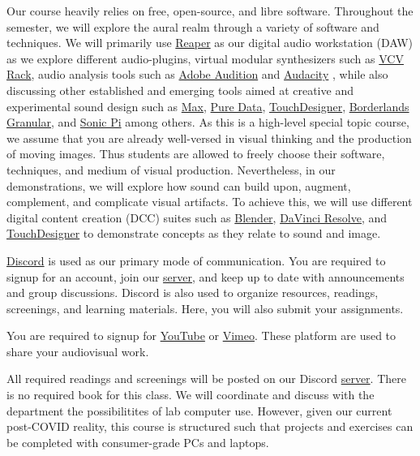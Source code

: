 Our course heavily relies on free, open-source, and libre software. Throughout the semester, we will explore the aural realm through a variety of software and techniques. We will primarily use \href{https://www.reaper.fm/}{Reaper} as our digital audio workstation (DAW) as we explore different audio-plugins, virtual modular synthesizers such as \href{https://vcvrack.com/Rack}{VCV Rack}, audio analysis tools such as \href{https://www.adobe.com/products/audition.html}{Adobe Audition} and \href{https://www.audacityteam.org/}{Audacity} , while also discussing other established and emerging tools aimed at creative and experimental sound design such as \href{https://cycling74.com/products/max}{Max}, \href{https://puredata.info/}{Pure Data}, \href{https://derivative.ca/}{TouchDesigner}, \href{http://www.borderlands-granular.com/app/}{Borderlands Granular}, and \href{https://sonic-pi.net/}{Sonic Pi} among others. As this is a high-level special topic course, we assume that you are already well-versed in visual thinking and the production of moving images. Thus students are allowed to freely choose their software, techniques, and medium of visual production. Nevertheless, in our demonstrations, we will explore how sound can build upon, augment, complement, and complicate visual artifacts. To achieve this, we will use different digital content creation (DCC) suites such as \href{http://blender.org/}{Blender}, \href{https://www.blackmagicdesign.com/products/davinciresolve/}{DaVinci Resolve}, and \href{https://derivative.ca/}{TouchDesigner} to demonstrate concepts as they relate to sound and image.


\href{http://discordapp.com/}{Discord} is used as our primary mode of communication. You are required to signup for an account, join our \href{\discordURL}{server}, and keep up to date with announcements and group discussions. Discord is also used to organize resources, readings, screenings, and learning materials. Here, you will also submit your assignments.

You are required to signup for \href{https://www.youtube.com/}{YouTube} or \href{https://vimeo.com/}{Vimeo}. These platform are used to share your audiovisual work.

All required readings and screenings will be posted on our Discord \href{\discordURL}{server}. There is no required book for this class. We will coordinate and discuss with the department the possibilitites of lab computer use. However, given our current post-COVID reality, this course is structured such that projects and exercises can be completed with consumer-grade PCs and laptops.